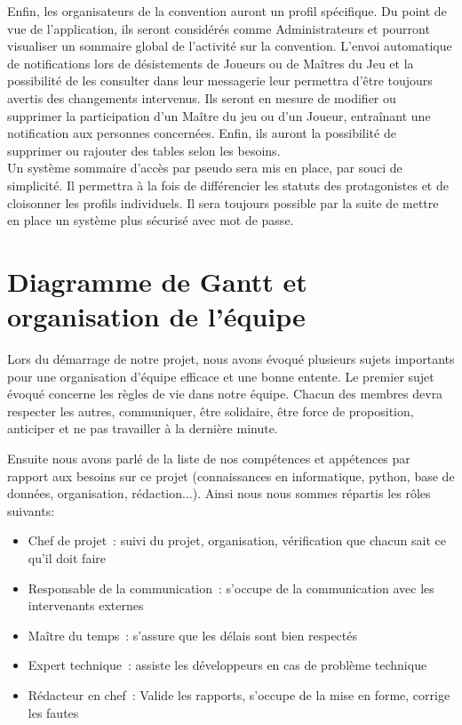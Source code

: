 \documentclass[11pt]{article}
\begin{document}
Enfin, les organisateurs de la convention auront un profil spécifique. Du point de vue de l'application, ils seront considérés comme Administrateurs et pourront visualiser un sommaire global de l'activité sur la convention. L'envoi automatique de notifications lors de désistements de Joueurs ou de Maîtres du Jeu et la possibilité de les consulter dans leur messagerie leur permettra d'être toujours avertis des changements intervenus. Ils seront en mesure de modifier ou supprimer la participation d'un Maître du jeu ou d'un Joueur, entraînant une notification aux personnes concernées. Enfin, ils auront la possibilité de supprimer ou rajouter des tables selon les besoins.\\

Un système sommaire d'accès par pseudo sera mis en place, par souci de simplicité. Il permettra à la fois de différencier les statuts des protagonistes et de cloisonner les profils individuels. Il sera toujours possible par la suite de mettre en place un système plus sécurisé avec mot de passe. \\

\newpage
\section{Diagramme de Gantt et organisation de l'équipe}
Lors du démarrage de notre projet, nous avons évoqué plusieurs sujets importants pour une organisation d'équipe efficace et une bonne entente. Le premier sujet évoqué concerne les règles de vie dans notre équipe. Chacun des membres devra respecter les autres, communiquer, être solidaire, être force de proposition, anticiper et ne pas travailler à la dernière minute.


\bigbreak

Ensuite nous avons parlé de la liste de nos compétences et appétences par rapport aux besoins sur ce projet (connaissances en informatique, python, base de données, organisation, rédaction...). Ainsi nous nous sommes répartis les rôles suivants:
\begin{itemize}
    \item{Chef de projet~: suivi du projet, organisation, vérification que chacun sait ce qu’il doit faire}
    \item{Responsable de la communication~: s'occupe de la communication avec les intervenants externes}
    \item{Maître du temps~: s’assure que les délais sont bien respectés}
    \item{Expert technique~: assiste les développeurs en cas de problème technique}
    \item{Rédacteur en chef~: Valide les rapports, s'occupe de la mise en forme, corrige les fautes}
\end{itemize}
\end{document}
